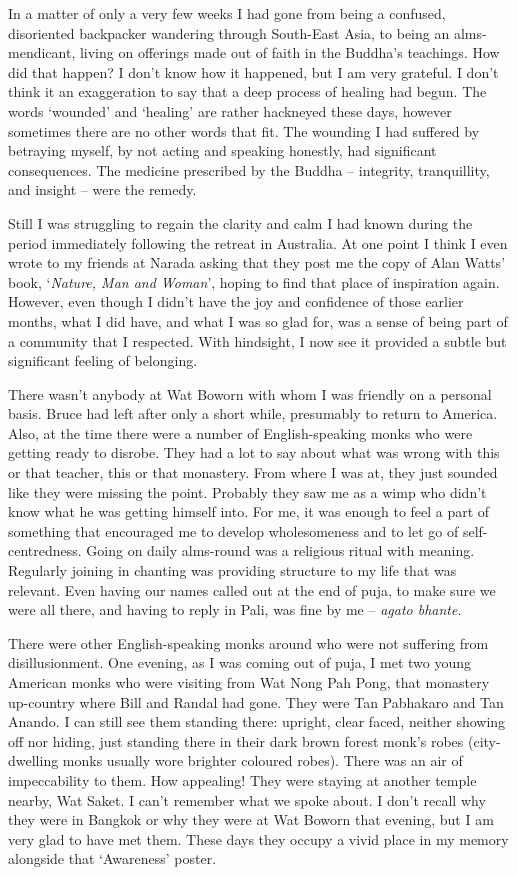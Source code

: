 In a matter of only a very few weeks I had gone from being a confused,
disoriented backpacker wandering through South-East Asia, to being an
alms-mendicant, living on offerings made out of faith in the Buddha's
teachings. How did that happen? I don't know how it happened, but I am
very grateful. I don't think it an exaggeration to say that a deep
process of healing had begun. The words `wounded' and `healing' are
rather hackneyed these days, however sometimes there are no other words
that fit. The wounding I had suffered by betraying myself, by not acting
and speaking honestly, had significant consequences. The medicine
prescribed by the Buddha -- integrity, tranquillity, and insight -- were
the remedy.

Still I was struggling to regain the clarity and calm I had known during
the period immediately following the retreat in Australia. At one point
I think I even wrote to my friends at Narada asking that they post me
the copy of Alan Watts' book, `\emph{Nature, Man and Woman}', hoping to
find that place of inspiration again. However, even though I didn't have
the joy and confidence of those earlier months, what I did have, and
what I was so glad for, was a sense of being part of a community that I
respected. With hindsight, I now see it provided a subtle but
significant feeling of belonging.

There wasn't anybody at Wat Boworn with whom I was friendly on a
personal basis. Bruce had left after only a short while, presumably to
return to America. Also, at the time there were a number of
English-speaking monks who were getting ready to disrobe. They had a lot
to say about what was wrong with this or that teacher, this or that
monastery. From where I was at, they just sounded like they were missing
the point. Probably they saw me as a wimp who didn't know what he was
getting himself into. For me, it was enough to feel a part of something
that encouraged me to develop wholesomeness and to let go of
self-centredness. Going on daily alms-round was a religious ritual with
meaning. Regularly joining in chanting was providing structure to my
life that was relevant. Even having our names called out at the end of
puja, to make sure we were all there, and having to reply in
Pali, was fine by me -- \emph{agato bhante}.

There were other English-speaking monks around who were not suffering
from disillusionment. One evening, as I was coming out of puja, I met
two young American monks who were visiting from Wat Nong Pah Pong, that
monastery up-country where Bill and Randal had gone. They were Tan
Pabhakaro and Tan Anando. I can still see them standing there: upright,
clear faced, neither showing off nor hiding, just standing there in
their dark brown forest monk's robes (city-dwelling monks usually wore
brighter coloured robes). There was an air of impeccability to them. How
appealing! They were staying at another temple nearby, Wat Saket. I
can't remember what we spoke about. I don't recall why they were in
Bangkok or why they were at Wat Boworn that evening, but I am very glad
to have met them. These days they occupy a vivid place in my memory
alongside that `Awareness' poster.

